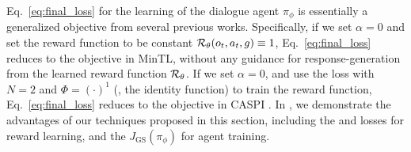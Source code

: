 Eq.~\eqref{eq:final_loss} for the learning of the dialogue agent $\pi_{\phi}$ is essentially a generalized objective from several previous works.
Specifically, if we set $\alpha = 0$ and set the reward function to be constant ${\mathcal{R}}_{\theta}(o_t, a_t, g)\equiv 1$, 
 Eq.~\eqref{eq:final_loss} reduces to the objective in MinTL, without any guidance for response-generation from the learned reward function ${\mathcal{R}}_{\theta}$.
If we set $\alpha = 0$, and use the \rewardnet loss with $N=2$ and $\Phi=(\cdot)^{1}$ (\ie, the identity function) to train the reward function,  Eq.~\eqref{eq:final_loss} reduces to the objective in CASPI \citep{caspi2021}. 
In , we demonstrate the advantages of our  techniques proposed in this section, including the \rewardnet and \rewardmle losses for reward learning, and  the $J_{\mathrm{GS}}(\pi_{\phi})$ for agent training.










